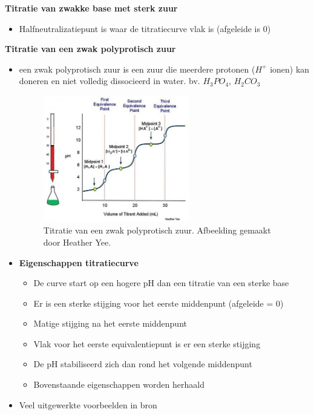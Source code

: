 \documentclass[10pt]{report}
\begin{document}
\textbf{Titratie van zwakke base met sterk zuur}
\begin{itemize}
    \item Halfneutralizatiepunt is waar de titratiecurve vlak is (afgeleide is 0)
\end{itemize}
\textbf{Titratie van een zwak polyprotisch zuur} 
\begin{itemize}
    \item een zwak polyprotisch zuur is een zuur die meerdere protonen ($H^+$ ionen) kan doneren en niet volledig dissocieerd in water. bv. $H_3PO_4$, $H_2CO_3$
    \newpage
    \begin{figure}[h]
        \centering
        \includegraphics[width=0.6\textwidth]{TitratieZwakMeervoudigZuur.jpg}
        \caption{Titratie van een zwak polyprotisch zuur. Afbeelding gemaakt door Heather Yee.}
    \end{figure}
    \item \textbf{Eigenschappen titratiecurve}
        \begin{itemize}
            \item De curve start op een hogere pH dan een titratie van een sterke base
            \item Er is een sterke stijging voor het eerste middenpunt (afgeleide = 0)
            \item Matige stijging na het eerste middenpunt
            \item Vlak voor het eerste equivalentiepunt is er een sterke stijging
            \item De pH stabiliseerd zich dan rond het volgende middenpunt
            \item Bovenstaande eigenschappen worden herhaald
        \end{itemize}
    \item Veel uitgewerkte voorbeelden in bron
\end{itemize}
\end{document}
